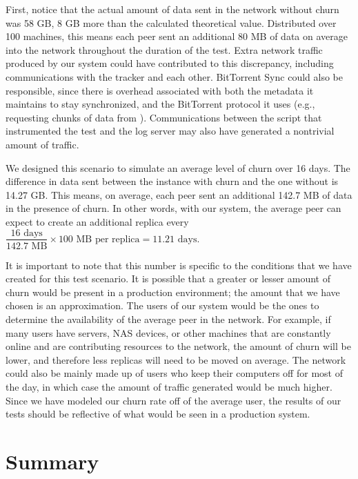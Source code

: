 \documentclass[12pt]{report}
\begin{document}
First, notice that the actual amount of data sent in the network without churn was 58 GB, 8 GB more than the calculated theoretical value. Distributed over 100 machines, this means each peer sent an additional 80 MB of data on average into the network throughout the duration of the test. Extra network traffic produced by our system could have contributed to this discrepancy, including communications with the tracker and each other. BitTorrent Sync could also be responsible, since there is overhead associated with both the metadata it maintains to stay synchronized, and the BitTorrent protocol it uses (e.g., requesting chunks of data from ). Communications between the script that instrumented the test and the log server may also have generated a nontrivial amount of traffic.

We designed this scenario to simulate an average level of churn over 16 days. The difference in data sent between the instance with churn and the one without is 14.27 GB. This means, on average, each peer sent an additional 142.7 MB of data in the presence of churn. In other words, with our system, the average peer can expect to create an additional replica every $\dfrac{16 \text{ days}}{142.7 \text{ MB}} \times 100 \text{ MB per replica} = 11.21 \text{ days}$.

It is important to note that this number is specific to the conditions that we have created for this test scenario. It is possible that a greater or lesser amount of churn would be present in a production environment; the amount that we have chosen is an approximation. The users of our system would be the ones to determine the availability of the average peer in the network. For example, if many users have servers, NAS devices, or other machines that are constantly online and are contributing resources to the network, the amount of churn will be lower, and therefore less replicas will need to be moved on average. The network could also be mainly made up of users who keep their computers off for most of the day, in which case the amount of traffic generated would be much higher. Since we have modeled our churn rate off of the average user, the results of our tests should be reflective of what would be seen in a production system.

\section{Summary}

\end{document}
